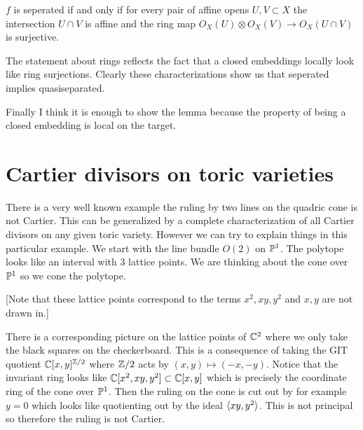 \documentclass[12pt]{article}
\begin{document}
\hfill

\begin{theorem}
    $f$ is seperated if and only if for every pair of affine opens $U,V\subset X$ the intersection $U\cap V$ is affine and the ring map $O_X(U)\otimes O_X(V)\to O_X(U\cap V)$ is surjective.
\end{theorem}

\hfill

The statement about rings reflects the fact that a closed embeddings locally look like ring surjections. Clearly these characterizations show us that seperated implies quasiseparated. 

\hfill

Finally I think it is enough to show the lemma because the property of being a closed embedding is local on the target.
\section{Cartier divisors on toric varieties}

There is a very well known example the ruling by two lines on the quadric cone is not Cartier. This can be generalized by 
a complete characterization of all Cartier divisors on any given toric variety. However we can try to explain things 
in this particular example. We start with the line bundle $O(2)$ on $\P^1$. The polytope looks like an interval
with 3 lattice points. We are thinking about the cone over $\P^1$ so we cone the polytope.

\begin{center}
\end{center}

[Note that these lattice points correspond to the terms $x^2,xy,y^2$ and $x,y$ are not drawn in.]

There is a corresponding picture on the lattice points of $\C^2$ where we only take the black squares on the checkerboard.
This is a consequence of taking the GIT quotient $\C[x,y]^{\Z/2}$ where $\Z/2$ acts by $(x,y)\mapsto (-x,-y)$. Notice that the 
invariant ring looks like $\C[x^2,xy,y^2] \subset \C[x,y]$ which is precisely the coordinate ring of the cone over $\P^1$. Then the ruling on the cone is cut out by for example $y = 0$ which looks like quotienting out by the ideal $\ideal{xy,y^2}$. This is 
not principal so therefore the ruling is not Cartier.
\end{document}
